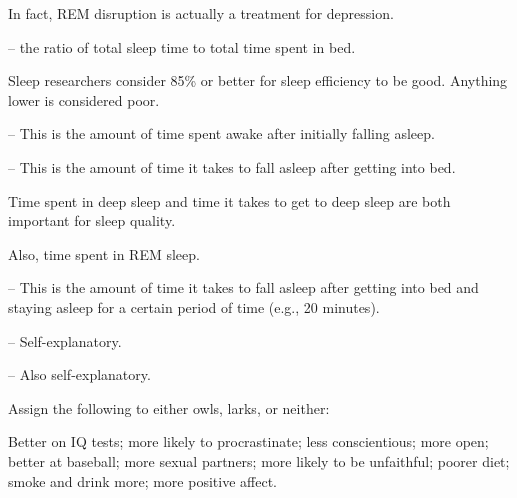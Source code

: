 \begin{coloredlist}
\begin{coloredlist}
        \item In fact, REM disruption is actually a treatment for depression.
    \end{coloredlist}
    \item {} -- the ratio of total sleep time to total time spent in bed.
    \begin{coloredlist}
        \item Sleep researchers consider 85\% or better for sleep efficiency to be good. Anything lower is considered poor.
        \item {} -- This is the amount of time spent awake after initially falling asleep.
        \item {} -- This is the amount of time it takes to fall asleep after getting into bed.
        \item Time spent in deep sleep and time it takes to get to deep sleep are both important for sleep quality.
        \item Also, time spent in REM sleep.  
        \item {} -- This is the amount of time it takes to fall asleep after getting into bed and staying asleep for a certain period of time (e.g., 20 minutes).
        \item {} -- Self-explanatory.
        \item {} -- Also self-explanatory.
    \end{coloredlist}
    \item Assign the following to either owls, larks, or neither:
    \begin{coloredlist}
        \item Better on IQ tests; more likely to procrastinate; less conscientious; more open; better at baseball; more sexual partners; more likely to be unfaithful; poorer diet; smoke and drink more; more positive affect.
    \end{coloredlist}
\end{coloredlist}

